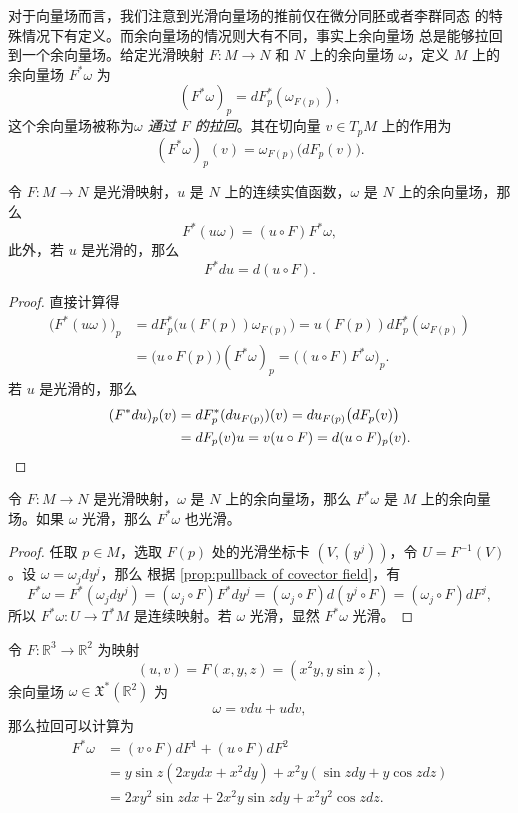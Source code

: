 \documentclass[fontset=none]{Notes}
\begin{document}
对于向量场而言，我们注意到光滑向量场的推前仅在微分同胚或者李群同态
的特殊情况下有定义。而余向量场的情况则大有不同，事实上余向量场
总是能够拉回到一个余向量场。给定光滑映射 $F:M\to N$ 和
$N$ 上的余向量场 $\omega$，定义 $M$ 上的余向量场 $F^*\omega$
为
\[
  (F^*\omega)_p =dF_p^*(\omega_{F(p)}),
\]
这个余向量场被称为\emph{$\omega$ 通过 $F$ 的拉回}。其在切向量 $v\in T_pM$
上的作用为
\[
  (F^*\omega)_p(v)=\omega_{F(p)}\bigl(dF_p(v)\bigr)  .
\]

\begin{proposition}\label{prop:pullback of covector field}
  令 $F:M\to N$ 是光滑映射，$u$ 是 $N$ 上的连续实值函数，$\omega$ 是
  $N$ 上的余向量场，那么
  \[
    F^*(u\omega)=(u\circ F)F^*\omega,  
  \]
  此外，若 $u$ 是光滑的，那么
  \[
    F^*du=d(u\circ F).  
  \]
\end{proposition}
\begin{proof}
  直接计算得
  \begin{align*}
    \bigl(F^*(u\omega)\bigr)_p&=dF_p^*\bigl(u(F(p))\omega_{F(p)}\bigr)
    =u(F(p))dF_p^*(\omega_{F(p)})\\
    &=\bigl(u\circ F(p)\bigr) (F^*\omega)_p=\bigl((u\circ F)F^*\omega\bigr)_p.
  \end{align*}
  若 $u$ 是光滑的，那么
  \begin{align*}
    (F^*du)_p(v)&=dF_p^*(du_{F(p)})(v)=du_{F(p)}\bigl(dF_p(v)\bigr)\\
    &=dF_p(v)u=v(u\circ F)=d(u\circ F)_p(v).\qedhere
  \end{align*}
\end{proof}

\begin{proposition}
  令 $F:M\to N$ 是光滑映射，$\omega$ 是
  $N$ 上的余向量场，那么 $F^*\omega$ 是 $M$ 上的余向量场。如果
  $\omega$ 光滑，那么 $F^*\omega$ 也光滑。
\end{proposition}
\begin{proof}
  任取 $p\in M$，选取 $F(p)$ 处的光滑坐标卡 $(V,(y^j))$，令
  $U=F^{-1}(V)$。设 $\omega=\omega_jdy^j$，那么
  根据 \autoref{prop:pullback of covector field}，有
  \[
    F^*\omega=F^*\left(\omega_jdy^j\right)=
    (\omega_j\circ F)F^*dy^j=
    (\omega_j\circ F)d(y^j\circ F)=(\omega_j\circ F)dF^j,  
  \]
  所以 $F^*\omega:U\to T^*M$ 是连续映射。若 $\omega$ 光滑，显然
  $F^*\omega$ 光滑。
\end{proof}

\begin{example}
  令 $F:\mathbb{R}^3\to \mathbb{R}^2$ 为映射
  \[
    (u,v)=F(x,y,z) =(x^2y,y\sin z),
  \]
  余向量场 $\omega\in \mathfrak{X}^*(\mathbb{R}^2)$ 为
  \[
    \omega=vdu+udv,  
  \]
  那么拉回可以计算为
  \begin{align*}
    F^*\omega&=(v\circ F)dF^1+(u\circ F)dF^2\\
    &=y\sin z (2xydx+x^2dy)+x^2y(\sin zdy+y\cos zdz)\\
    &=2xy^2\sin z dx+2x^2y\sin zdy+x^2y^2\cos zdz.
  \end{align*}
\end{example}
\end{document}
